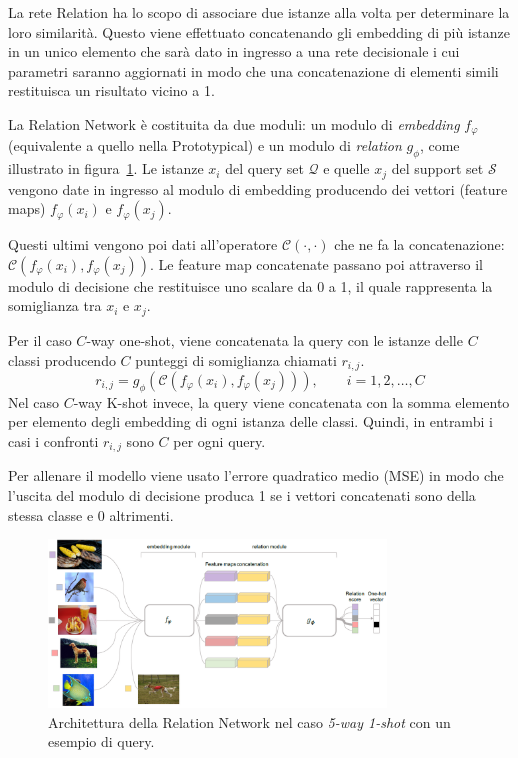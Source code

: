 \documentclass[12pt,a4paper,titlepage]{article}
\begin{document}
La rete Relation ha lo scopo di associare due istanze alla volta per determinare la loro similarità.
Questo viene effettuato concatenando gli embedding di più istanze in un unico elemento che sarà dato in ingresso a una rete decisionale i cui parametri saranno aggiornati in modo che una concatenazione di elementi simili restituisca un risultato vicino a 1.

La Relation Network è costituita da due moduli: un modulo di \emph{embedding} $f_\varphi$ (equivalente a quello nella Prototypical) e un modulo di \emph{relation} $g_\phi$, come illustrato in figura~\ref{fig:relation_network}.
Le istanze $x_i$ del query set $\mathcal{Q}$ e quelle $x_j$ del support set $\mathcal{S}$ vengono date in ingresso al modulo di embedding producendo dei vettori (feature maps) $f_\varphi(x_i)$ e $f_\varphi(x_j)$.

Questi ultimi vengono poi dati all'operatore $\mathcal{C}(\cdot ,\cdot)$ che ne fa la concatenazione: $\mathcal{C}(f_\varphi(x_i),f_\varphi(x_j))$.
Le feature map concatenate passano poi attraverso il modulo di decisione che restituisce uno scalare da 0 a 1, il quale rappresenta la somiglianza tra $x_i$ e $x_j$.

Per il caso $C$-way one-shot, viene concatenata la query con le istanze delle $C$ classi producendo $C$ punteggi di somiglianza chiamati $r_{i,j}$.
\begin{equation}
	r_{i,j}=g_\phi(\mathcal{C}(f_\varphi(x_i),f_\varphi(x_j))),  \qquad i = 1, 2, \dots, C
\end{equation}
Nel caso $C$-way K-shot invece, la query viene concatenata con la somma elemento per elemento degli embedding di ogni istanza delle classi. Quindi, in entrambi i casi i confronti $r_{i,j}$ sono $C$ per ogni query.

Per allenare il modello viene usato l'errore quadratico medio (MSE) in modo che l'uscita del modulo di decisione produca 1 se i vettori concatenati sono della stessa classe e 0 altrimenti.

\begin{figure}[h]
	\centering	
	\includegraphics[width=0.8\textwidth]{Immagini/relation_network}
	\caption{Architettura della Relation Network nel caso \textit{5-way 1-shot} con un esempio di query.~\cite{sung:relation}}
	\label{fig:relation_network}
\end{figure}
\end{document}
